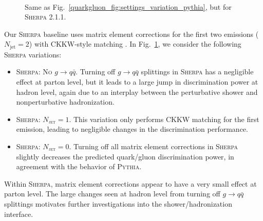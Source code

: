 \documentclass[11pt]{cernrep}
\begin{document}
\begin{figure}
\centering
{}
$\qquad$
\caption{Same as Fig.~\ref{quarkgluon_fig:settings_variation_pythia}, but for \textsc{Sherpa 2.1.1}.}
\label{quarkgluon_fig:settings_variation_sherpa}
\end{figure}

Our  \textsc{Sherpa} baseline uses matrix element corrections for the first two emissions ($N_\text{jet} = 2$) with CKKW-style matching \cite{Catani:2001cc}.  In Fig.~\ref{quarkgluon_fig:settings_variation_sherpa}, we consider the following \textsc{Sherpa} variations:
\begin{itemize}
\item \textsc{Sherpa: No $g \to q\bar{q}$}.  Turning off $g \to q \bar{q}$ splittings in \textsc{Sherpa} has a negligible effect at parton level, but it leads to a large jump in discrimination power at hadron level, again due to an interplay between the perturbative shower and nonperturbative hadronization.
\item \textsc{Sherpa: $N_\text{jet} = 1$}.  This variation only performs CKKW matching for the first emission, leading to negligible changes in the discrimination performance.
\item \textsc{Sherpa: $N_\text{jet} = 0$}.  Turning off all matrix element corrections in \textsc{Sherpa} slightly decreases the predicted quark/gluon discrimination power, in agreement with the behavior of \textsc{Pythia}.
\end{itemize}
Within \textsc{Sherpa}, matrix element corrections appear to have a very small effect at parton level.  The large changes seen at hadron level from turning off $g \to q \bar{q}$ splittings motivates further investigations into the shower/hadronization interface.
\end{document}
